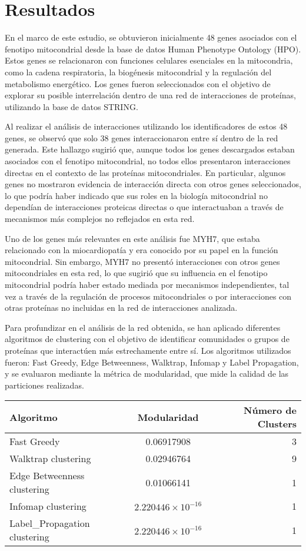 
\section{Resultados}


En el marco de este estudio, se obtuvieron inicialmente 48 genes asociados con el fenotipo mitocondrial desde la base de datos Human Phenotype Ontology (HPO). Estos genes se relacionaron con funciones celulares esenciales en la mitocondria, como la cadena respiratoria, la biogénesis mitocondrial y la regulación del metabolismo energético. Los genes fueron seleccionados con el objetivo de explorar su posible interrelación dentro de una red de interacciones de proteínas, utilizando la base de datos STRING.

Al realizar el análisis de interacciones utilizando los identificadores de estos 48 genes, se observó que solo 38 genes interaccionaron entre sí dentro de la red generada. Este hallazgo sugirió que, aunque todos los genes descargados estaban asociados con el fenotipo mitocondrial, no todos ellos presentaron interacciones directas en el contexto de las proteínas mitocondriales. En particular, algunos genes no mostraron evidencia de interacción directa con otros genes seleccionados, lo que podría haber indicado que sus roles en la biología mitocondrial no dependían de interacciones proteicas directas o que interactuaban a través de mecanismos más complejos no reflejados en esta red.

Uno de los genes más relevantes en este análisis fue MYH7, que estaba relacionado con la miocardiopatía y era conocido por su papel en la función mitocondrial. Sin embargo, MYH7 no presentó interacciones con otros genes mitocondriales en esta red, lo que sugirió que su influencia en el fenotipo mitocondrial podría haber estado mediada por mecanismos independientes, tal vez a través de la regulación de procesos mitocondriales o por interacciones con otras proteínas no incluidas en la red de interacciones analizada.


Para profundizar en el análisis de la red obtenida, se han aplicado diferentes algoritmos de clustering con el objetivo de identificar comunidades o grupos de proteínas que interactúen más estrechamente entre sí. Los algoritmos utilizados fueron: Fast Greedy, Edge Betweenness, Walktrap, Infomap y Label Propagation, y se evaluaron mediante la métrica de modularidad, que mide la calidad de las particiones realizadas.
\vspace{1em}

\begin{tabular}{|l|c|r|}
	\hline
	\textbf{Algoritmo} & \textbf{Modularidad} & \textbf{Número de Clusters} \\
	\hline
	Fast Greedy & 0.06917908 & 3 \\
	\hline
	Walktrap clustering & 0.02946764 & 9 \\
	\hline
	Edge Betweenness clustering & 0.01066141 & 1 \\
	\hline
	Infomap clustering & \(2.220446 \times 10^{-16}\) & 1 \\
	\hline
	Label\_Propagation clustering & \(2.220446 \times 10^{-16}\) & 1 \\
	\hline
\end{tabular}


